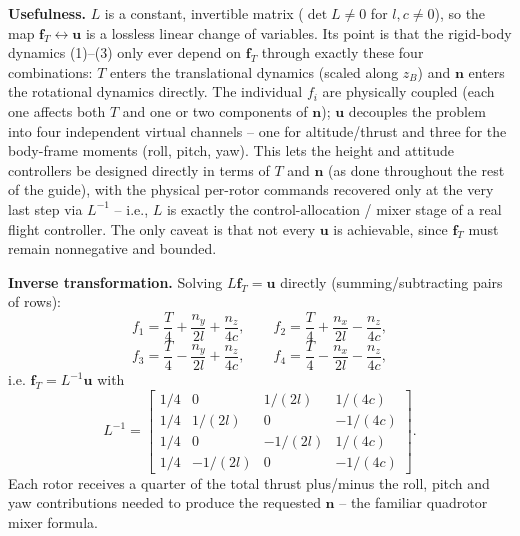 \documentclass[11pt]{article}
\newcommand{\vect}[1]{\mathbf{#1}}
\begin{document}
\textbf{Usefulness.} $L$ is a constant, invertible matrix ($\det L \neq 0$ for $l,c\neq0$), so the map $\vect{f}_T \leftrightarrow \vect{u}$ is a lossless linear change of variables. Its point is that the rigid-body dynamics (1)--(3) only ever depend on $\vect{f}_T$ through exactly these four combinations: $T$ enters the translational dynamics (scaled along $z_B$) and $\vect{n}$ enters the rotational dynamics directly. The individual $f_i$ are physically coupled (each one affects both $T$ and one or two components of $\vect{n}$); $\vect{u}$ decouples the problem into four independent virtual channels -- one for altitude/thrust and three for the body-frame moments (roll, pitch, yaw). This lets the height and attitude controllers be designed directly in terms of $T$ and $\vect{n}$ (as done throughout the rest of the guide), with the physical per-rotor commands recovered only at the very last step via $L^{-1}$ -- i.e., $L$ is exactly the control-allocation / mixer stage of a real flight controller. The only caveat is that not every $\vect{u}$ is achievable, since $\vect{f}_T$ must remain nonnegative and bounded.

\textbf{Inverse transformation.} Solving $L\vect{f}_T=\vect{u}$ directly (summing/subtracting pairs of rows):
\[
f_1 = \frac{T}{4} + \frac{n_y}{2l} + \frac{n_z}{4c}, \qquad
f_2 = \frac{T}{4} + \frac{n_x}{2l} - \frac{n_z}{4c},
\]
\[
f_3 = \frac{T}{4} - \frac{n_y}{2l} + \frac{n_z}{4c}, \qquad
f_4 = \frac{T}{4} - \frac{n_x}{2l} - \frac{n_z}{4c},
\]
i.e. $\vect{f}_T = L^{-1}\vect{u}$ with
\[
L^{-1} = \begin{bmatrix}
1/4 & 0 & 1/(2l) & 1/(4c) \\
1/4 & 1/(2l) & 0 & -1/(4c) \\
1/4 & 0 & -1/(2l) & 1/(4c) \\
1/4 & -1/(2l) & 0 & -1/(4c)
\end{bmatrix}.
\]
Each rotor receives a quarter of the total thrust plus/minus the roll, pitch and yaw contributions needed to produce the requested $\vect{n}$ -- the familiar quadrotor mixer formula.
\end{document}
